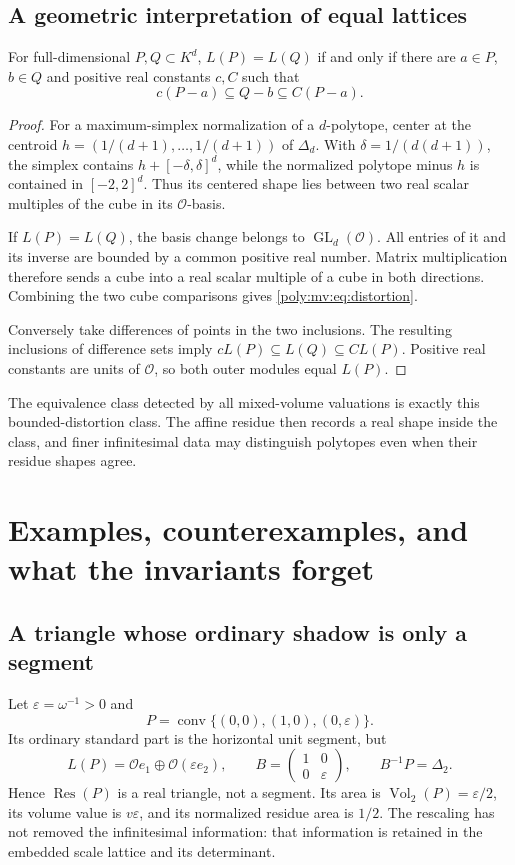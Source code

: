 \documentclass[11pt,a4paper]{article}
\numberwithin{equation}{section}
\theoremstyle{plain}
\newcommand{\eps}{\varepsilon}
\newcommand{\conv}{\operatorname{conv}}
\newcommand{\OO}{\mathcal O}
\newcommand{\Vol}{\operatorname{Vol}}
\newcommand{\Res}{\operatorname{Res}}
\newcommand{\GL}{\operatorname{GL}}
\begin{document}
\subsection{A geometric interpretation of equal lattices}
\begin{proposition}
\label{poly:mv:prop:distortion}
For full-dimensional $P,Q\subset K^d$, $L(P)=L(Q)$ if and only if there
are $a\in P$, $b\in Q$ and positive real constants $c,C$ such that
\begin{equation}
\label{poly:mv:eq:distortion}
 c(P-a)\subseteq Q-b\subseteq C(P-a).
\end{equation}
\end{proposition}
\begin{proof}
For a maximum-simplex normalization of a $d$-polytope, center at the
centroid $h=(1/(d+1),\ldots,1/(d+1))$ of $\Delta_d$. With
$\delta=1/(d(d+1))$, the simplex contains
$h+[-\delta,\delta]^d$, while the normalized polytope minus $h$ is
contained in $[-2,2]^d$. Thus its centered shape lies between two real
scalar multiples of the cube in its $\OO$-basis.

If $L(P)=L(Q)$, the basis change belongs to $\GL_d(\OO)$. All entries
of it and its inverse are bounded by a common positive real number.
Matrix multiplication therefore sends a cube into a real scalar multiple
of a cube in both directions. Combining the two cube comparisons gives
\eqref{poly:mv:eq:distortion}.

Conversely take differences of points in the two inclusions. The
resulting inclusions of difference sets imply
$cL(P)\subseteq L(Q)\subseteq CL(P)$. Positive real constants are units
of $\OO$, so both outer modules equal $L(P)$.
\end{proof}

The equivalence class detected by all mixed-volume valuations is exactly
this bounded-distortion class. The affine residue then records a real
shape inside the class, and finer infinitesimal data may distinguish
polytopes even when their residue shapes agree.

\section{Examples, counterexamples, and what the invariants forget}
\label{poly:mv:sec:examples}

\subsection{A triangle whose ordinary shadow is only a segment}
Let $\eps=\omega^{-1}>0$ and
\[
 P=\conv\{(0,0),(1,0),(0,\eps)\}.
\]
Its ordinary standard part is the horizontal unit segment, but
\[
 L(P)=\OO e_1\oplus\OO(\eps e_2),\qquad
 B=\begin{pmatrix}1&0\\0&\eps\end{pmatrix},\qquad
 B^{-1}P=\Delta_2.
\]
Hence $\Res(P)$ is a real triangle, not a segment. Its area is
$\Vol_2(P)=\eps/2$, its volume value is $v\eps$, and its normalized
residue area is $1/2$. The rescaling has not removed the infinitesimal
information: that information is retained in the embedded scale lattice
and its determinant.
\end{document}
